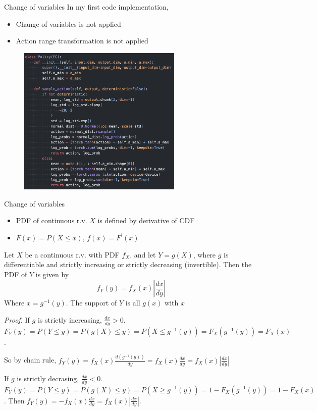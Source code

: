 \documentclass[8pt]{beamer}
\newcommand{\ti}[1]{\textit{#1}}
\newcommand{\abs}[1]{\left\lvert #1 \right\rvert}
\begin{document}
\begin{frame}{Change of variables}
    In my first code implementation, 
    \begin{itemize}
        \item Change of variables is not applied
        \item Action range transformation is not applied
    \end{itemize}
    \begin{figure}
        \centering
        \includegraphics[width=0.7\textwidth]{fig3.png}
    \end{figure}
\end{frame}


\begin{frame}{Change of variables}
    \begin{itemize}
        \item PDF of continuous r.v. $X$ is defined by derivative of CDF
        \item $F(x) = P(X \leq x)$, $f(x) = F^\prime (x)$
    \end{itemize}
    \begin{Theorem}
        Let $X$ be a continuous r.v. with PDF $f_X$, and let $Y=g(X)$, where $g$ is differentiable and strictly increasing or strictly decreasing (invertible). Then the PDF of $Y$ is given by
        \[
        f_Y(y) = f_X(x) \abs{\frac{dx}{dy}}
        \]
        Where $x=g^{-1}(y)$. The support of $Y$ is all $g(x)$ with $x$
    \end{Theorem}

    \bigskip
    \ti{Proof.} If $g$ is strictly increasing, $\frac{dx}{dy} > 0$. $F_Y(y) = P(Y \leq y) = P(g(X) \leq y) = P(X \leq g^{-1}(y)) = F_X(g^{-1}(y)) = F_X(x)$.

    So by chain rule, $f_Y(y) = f_X(x) \frac{d(g^{-1}(y))}{dy} = f_X(x) \frac{dx}{dy} = f_X(x) \abs{\frac{dx}{dy}}$

    If $g$ is strictly decrasing, $\frac{dx}{dy} < 0$.
    $
    F_Y(y) = P(Y \leq y) = P(g(X) \leq y) = P(X \geq g^{-1}(y)) = 1 - F_X(g^{-1}(y)) = 1 - F_X(x)
    $. Then $f_Y(y) = -f_X(x) \frac{dx}{dy} = f_X(x) \abs{\frac{dx}{dy}}$.
\end{frame}
\end{document}

